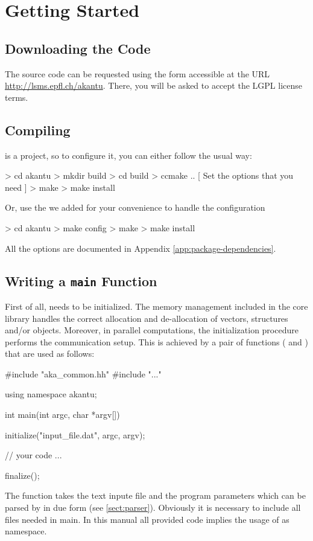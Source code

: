 \chapter{Getting Started}
\section{Downloading the Code}

The \akantu source code can be requested using the form accessible at the URL
\url{http://lsms.epfl.ch/akantu}.  There, you will be asked to accept the LGPL
license terms.

\section{Compiling \akantu}

\akantu is a  project, so to configure it, you can either
follow the usual way:
\begin{command}
  > cd akantu
  > mkdir build
  > cd build
  > ccmake ..
  [ Set the options that you need ]
  > make
  > make install
\end{command}

\noindent Or, use the  we added for your convenience to
handle the  configuration

\begin{command}
  > cd akantu
  > make config
  > make
  > make install
\end{command}

\noindent All the \akantu options are documented in Appendix
\ref{app:package-dependencies}.


\section{Writing a \texttt{main} Function\label{sect:common:main}}
\label{sec:writing_main}

First of all, \akantu needs to be initialized.  The memory management
included in the core library handles the correct allocation and
de-allocation of vectors, structures and/or objects. Moreover, in
parallel computations, the initialization procedure performs the
communication setup. This is achieved by a pair of functions
( and ) that are used as follows:
\begin{cpp}
#include "aka_common.hh"
#include "..."

using namespace akantu;

int main(int argc, char *argv[]) {
  initialize("input_file.dat", argc, argv);

  // your code
  ...

  finalize();
}
\end{cpp}
The  function takes the text inpute file and the program
parameters which can be parsed by \akantu in due form (see \ref{sect:parser}). 
Obviously it is necessary to include all files needed in main. In this manual
all provided code implies the usage of  as namespace.

